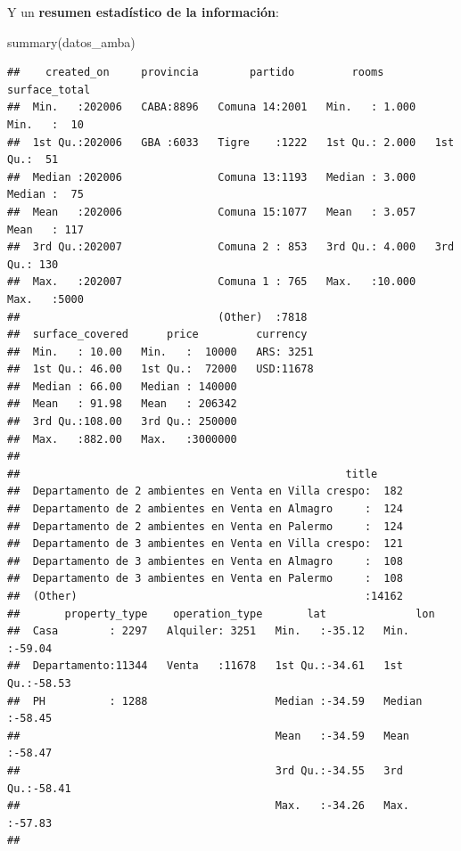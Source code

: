 \documentclass[
  spanish,
]{book}
\newenvironment{Shaded}{\begin{snugshade}}{\end{snugshade}}
\newcommand{\FunctionTok}[1]{\textcolor[rgb]{0.00,0.00,0.00}{#1}}
\newcommand{\NormalTok}[1]{#1}
\begin{document}
Y un \textbf{resumen estadístico de la información}:

\begin{Shaded}
\begin{Highlighting}[]
\FunctionTok{summary}\NormalTok{(datos\_amba)}
\end{Highlighting}
\end{Shaded}

\begin{verbatim}
##    created_on     provincia        partido         rooms        surface_total 
##  Min.   :202006   CABA:8896   Comuna 14:2001   Min.   : 1.000   Min.   :  10  
##  1st Qu.:202006   GBA :6033   Tigre    :1222   1st Qu.: 2.000   1st Qu.:  51  
##  Median :202006               Comuna 13:1193   Median : 3.000   Median :  75  
##  Mean   :202006               Comuna 15:1077   Mean   : 3.057   Mean   : 117  
##  3rd Qu.:202007               Comuna 2 : 853   3rd Qu.: 4.000   3rd Qu.: 130  
##  Max.   :202007               Comuna 1 : 765   Max.   :10.000   Max.   :5000  
##                               (Other)  :7818                                  
##  surface_covered      price         currency   
##  Min.   : 10.00   Min.   :  10000   ARS: 3251  
##  1st Qu.: 46.00   1st Qu.:  72000   USD:11678  
##  Median : 66.00   Median : 140000              
##  Mean   : 91.98   Mean   : 206342              
##  3rd Qu.:108.00   3rd Qu.: 250000              
##  Max.   :882.00   Max.   :3000000              
##                                                
##                                                   title      
##  Departamento de 2 ambientes en Venta en Villa crespo:  182  
##  Departamento de 2 ambientes en Venta en Almagro     :  124  
##  Departamento de 2 ambientes en Venta en Palermo     :  124  
##  Departamento de 3 ambientes en Venta en Villa crespo:  121  
##  Departamento de 3 ambientes en Venta en Almagro     :  108  
##  Departamento de 3 ambientes en Venta en Palermo     :  108  
##  (Other)                                             :14162  
##       property_type    operation_type       lat              lon        
##  Casa        : 2297   Alquiler: 3251   Min.   :-35.12   Min.   :-59.04  
##  Departamento:11344   Venta   :11678   1st Qu.:-34.61   1st Qu.:-58.53  
##  PH          : 1288                    Median :-34.59   Median :-58.45  
##                                        Mean   :-34.59   Mean   :-58.47  
##                                        3rd Qu.:-34.55   3rd Qu.:-58.41  
##                                        Max.   :-34.26   Max.   :-57.83  
## 
\end{verbatim}
\end{document}
